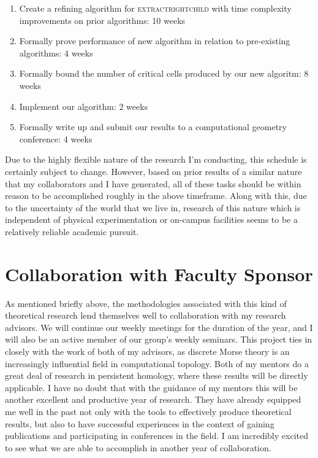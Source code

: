 \documentclass[11pt]{article}
\begin{document}
\begin{enumerate}
	\item Create a refining algorithm for \textsc{extractrightchild} with time complexity improvements on prior algorithms: 10 weeks
	\item Formally prove performance of new algorithm in relation to pre-existing algorithms: 4 weeks
	\item Formally bound the number of critical cells produced by our new algoritm: 8 weeks
	\item Implement our algorithm: 2 weeks
	\item Formally write up and submit our results to a computational geometry conference: 4 weeks
\end{enumerate}

Due to the highly flexible nature of the research I'm conducting, this schedule is certainly subject to change.
However, based on prior results of a similar nature that my collaborators and I have generated, all of these 
tasks should be within reason to be accomplished roughly in the above timeframe. Along with this, due to the 
uncertainty of the world that we live in, research of this nature which is independent of physical experimentation or on-campus facilities seems to be a relatively reliable academic pursuit.

\section{Collaboration with Faculty Sponsor}

As mentioned briefly above, the methodologies associated with this kind of theoretical 
research lend themselves well to collaboration with my research advisors. We will continue
our weekly meetings for the duration of the year, and I will also be an active member of 
our group's weekly seminars. This project ties in closely with the work of both of my advisors,
as discrete Morse theory is an increasingly influential field in computational topology.
Both of my mentors do a great deal of research in persistent homology, where these results
will be directly applicable. I have no doubt that with the guidance of my mentors this will be
another excellent and productive year of research. They have already equipped me well in the past
not only with the tools to effectively produce theoretical results, but also to have successful
experiences in the context of gaining publications and participating in conferences in the field.
I am incredibly excited to see what we are able to accomplish in another year of collaboration.
\end{document}
